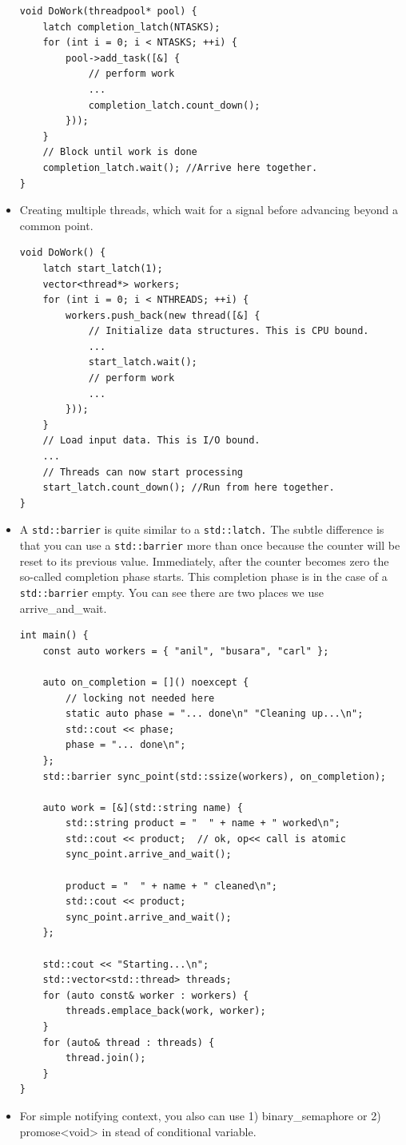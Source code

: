 \documentclass[a4paper,11pt,twoside]{book}
\begin{document}
\begin{itemize}
\begin{lstlisting}[numbers=none]
void DoWork(threadpool* pool) {
	latch completion_latch(NTASKS);
	for (int i = 0; i < NTASKS; ++i) {
		pool->add_task([&] {
			// perform work
			...
			completion_latch.count_down();
		}));
	}
	// Block until work is done
	completion_latch.wait(); //Arrive here together.
}
\end{lstlisting}	

	\item Creating multiple threads, which wait for a signal before advancing beyond a common point.
\begin{lstlisting}[numbers=none]
void DoWork() {
	latch start_latch(1);
	vector<thread*> workers;
	for (int i = 0; i < NTHREADS; ++i) {
		workers.push_back(new thread([&] {
			// Initialize data structures. This is CPU bound.
			...
			start_latch.wait();
			// perform work
			...
		}));
	}
	// Load input data. This is I/O bound.
	...
	// Threads can now start processing
	start_latch.count_down(); //Run from here together.
}
\end{lstlisting}

\item A \texttt{std::barrier} is quite similar to a \texttt{std::latch.} The subtle difference is that you can use a  \texttt{std::barrier} more than once because the counter will be reset to its previous value. Immediately, after the counter becomes zero the so-called completion phase starts. This completion phase is in the case of a \texttt{std::barrier} empty. You can see there are two places we use arrive\_and\_wait. 

\begin{lstlisting}[numbers=none]
int main() {
	const auto workers = { "anil", "busara", "carl" };
	
	auto on_completion = []() noexcept { 
		// locking not needed here
		static auto phase = "... done\n" "Cleaning up...\n";
		std::cout << phase;
		phase = "... done\n";
	};
	std::barrier sync_point(std::ssize(workers), on_completion);
	
	auto work = [&](std::string name) {
		std::string product = "  " + name + " worked\n";
		std::cout << product;  // ok, op<< call is atomic
		sync_point.arrive_and_wait();
		
		product = "  " + name + " cleaned\n";
		std::cout << product;
		sync_point.arrive_and_wait();
	};
	
	std::cout << "Starting...\n";
	std::vector<std::thread> threads;
	for (auto const& worker : workers) {
		threads.emplace_back(work, worker);
	}
	for (auto& thread : threads) {
		thread.join();
	}
}
\end{lstlisting}
    \item For simple notifying context, you also can use 1) binary\_semaphore or 2) promose<void> in stead of conditional variable.

\end{itemize}
\end{document}
